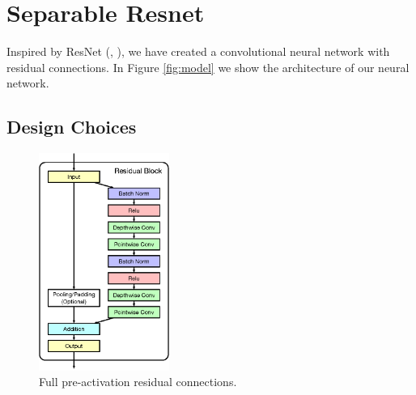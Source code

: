 \section{Separable Resnet}
Inspired by ResNet (\cite{He:2015aa}, ), we have created a convolutional neural network with residual connections. In Figure \ref{fig:model} we show the architecture of our neural network. 

\subsection{Design Choices}
\begin{figure}
\vspace{-65px}
\begin{center}
\includegraphics[width=0.38\textwidth]{images/full_preactivation.eps}
\end{center}
\caption{Full pre-activation residual connections.}
\label{fig:full-preactivation}
\end{figure}

